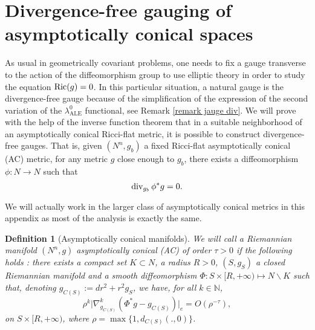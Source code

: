 \documentclass[a4paper,11pt,reqno]{amsart}
\newtheorem{defn}{Definition}[section]
\def\Ric{\mathop{\rm Ric}\nolimits}
\def\div{\mathop{\rm div}\nolimits}
\def\Ric{\mathop{\rm Ric}\nolimits}
\def\div{\mathop{\rm div}\nolimits}
\numberwithin{equation}{section}
\begin{document}
	\section{Divergence-free gauging of asymptotically conical spaces}\label{app-B}
	
	As usual in geometrically covariant problems, one needs to fix a gauge transverse to the action of the diffeomorphism group to use elliptic theory in order to study the equation $\Ric(g)=0$. In this particular situation, a natural gauge is the divergence-free gauge because of the simplification of the expression of the second variation of the $\lambda_{\operatorname{ALE}}^0$ functional, see Remark \ref{remark jauge div}. We will prove with the help of the inverse function theorem that in a suitable neighborhood of an asymptotically conical Ricci-flat metric, it is possible to construct divergence-free gauges. That is, given $(N^n,g_b)$ a fixed Ricci-flat asymptotically conical (AC) metric, for any metric $g$ close enough to $g_b$, there exists a diffeomorphism $\phi : N\to N$ such that 
	\begin{equation}
	\div_{g_b}\phi^*g =0.\label{eq jauge divergence}
	\end{equation}
	
	We will actually work in the larger class of asymptotically conical metrics in this appendix as most of the analysis is exactly the same.
	
	\begin{defn}[Asymptotically conical manifolds]
		We will call a Riemannian manifold $(N^n,g)$ \emph{asymptotically conical} (AC) of order $\tau>0$ if the following holds : there exists a compact set $K\subset N$, a radius $R>0$, $(S,g_S)$ a closed Riemannian manifold and a smooth diffeomorphism $\Phi : S\times [R,+\infty)\mapsto N\backslash K$ such that, denoting $g_{C(S)}:=dr^2+r^2g_S$, we have, for all $k\in \mathbb{N}$,
		$$ \rho^k\big|\nabla_{g_{C(S)}}^{k}(\Phi^*g-g_{C(S)})\big|_e = O(\rho^{-\tau}),$$
		on $S\times [R,+\infty)$, where $\rho =\max\{1, d_{C(S)}(.,0)\}$.
	\end{defn}
	
\end{document}
